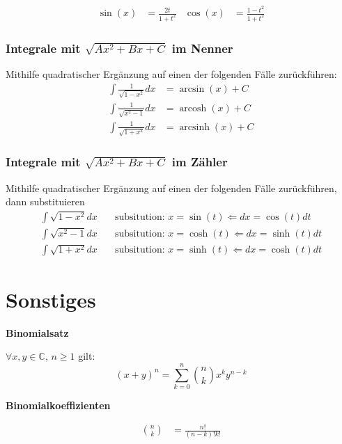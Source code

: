 \documentclass[25pt]{sciposter}
\newenvironment{method}[1]{\begin{mdframed}[backgroundcolor=blue!10,innertopmargin=15pt, innerbottommargin=15pt,nobreak=true]
		\textbf{#1 }
	}
	{ 
	\end{mdframed}
}
\begin{document}
\begin{multicols}{3}
\begin{align*}
\sin(x) &= \frac{2t}{1+t^2} & \cos(x) &= \frac{1-t^2}{1+t^2}
\end{align*}



\subsubsection*{Integrale mit $\sqrt{Ax^2 + Bx + C}$ im Nenner}
Mithilfe quadratischer Ergänzung auf einen der folgenden Fälle zurückführen:
\begin{align*}
\int \frac{1}{\sqrt{1-x^2}} dx &= \arcsin(x) + C\\
\int \frac{1}{\sqrt{x^2-1}} dx &= \operatorname{arcosh}(x) + C\\
\int \frac{1}{\sqrt{1+x^2}} dx &= \operatorname{arcsinh}(x) + C
\end{align*}




\subsubsection*{Integrale mit $\sqrt{Ax^2 + Bx + C}$ im Zähler}
Mithilfe quadratischer Ergänzung auf einen der folgenden Fälle zurückführen, dann substituieren
\begin{align*}
\int {\sqrt{1-x^2}} dx \quad &\text{subsitution: } x = \sin(t) \Leftarrow dx = \cos(t) dt\\
\int {\sqrt{x^2-1}} dx \quad &\text{subsitution: } x = \cosh(t) \Leftarrow dx = \sinh(t) dt \\
\int {\sqrt{1+x^2}} dx \quad &\text{subsitution: } x = \sinh(t) \Leftarrow dx = \cosh(t) dt
\end{align*}













\section*{Sonstiges}
\begin{method}{Binomialsatz}
	$\forall x,y \in \mathbb{C}$, $n \geq 1$ gilt:
	$$(x+y)^n = \sum_{k=0}^{n} \binom{n}{k}x^k y^{n-k}$$
\end{method}


\begin{method}{Binomialkoeffizienten}
	\begin{align*}
		\binom{n}{k} &= \frac{n!}{(n-k)!k!}
	\end{align*}
\end{method}


\end{multicols}
\end{document}
